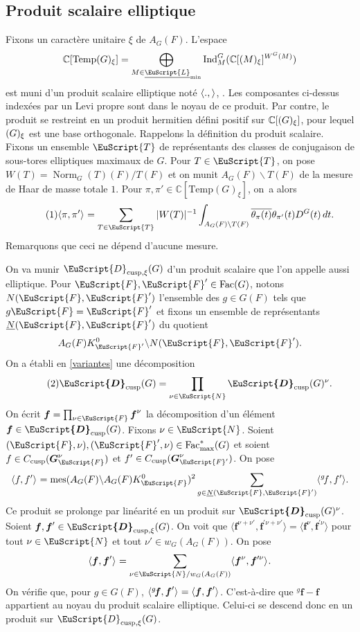 \documentclass[JEP,XML,SOM,Unicode,francais]{cedram}
\let\mathcal \EuScript
\newcommand{\NoChangel}[1]{%
\expandafter\let\csname old\string#1\endcsname=#1
\let#1=\relax
\newcommand{#1}{\mathcode`l="716C\csname old\string#1\endcsname\mathcode`l="7160 }%
}
\let\<\langle
\let\>\rangle
\let\oldS\S
\renewcommand{\S}{\oldS\,}
\newcommand{\gf}{{}^g\!f}
\newcommand{\cusp}{\mathrm{cusp}}
\newcommand{\rell}{\mathrm{ell}} \NoChangel{\rell}
\newcommand{\Ell}{\mathrm{Ell}} \NoChangel{\Ell}
\newcommand{\Fac}{\mathrm{Fac}}
\newcommand{\Ind}{\mathrm{Ind}}
\newcommand{\Temp}{\mathrm{Temp}}
\DeclareMathOperator{\mes}{mes}
\DeclareMathOperator{\Norm}{Norm}
\newcommand{\bmf}{\boldsymbol{f}}
\newcommand{\gbmf}{{}^g\!\boldsymbol{f}}
\newcommand{\bG}{\boldsymbol{G}}
\newcommand{\cD}{\mathcal{D}}
\newcommand{\cF}{\mathcal{F}}
\newcommand{\cL}{\mathcal{L}}
\newcommand{\cN}{\mathcal{N}}
\newcommand{\cT}{\mathcal{T}}
\newcommand{\CC}{\mathbb{C}}
\theoremstyle{plain}
\theoremstyle{definition}
\begin{document}
\subsection{Produit scalaire elliptique}\label{produitscalaireelliptique}
Fixons un caractère unitaire $\xi$ de $A_{G}(F)$. L'espace
\[
\CC[\Temp(G)_{\xi}]=\bigoplus_{M\in\underline{\cL}_{\min}}\Ind_{M}^G(\CC[\Ell(M)_{\xi}]^{W^G(M)})
\]
est muni d'un produit scalaire elliptique noté $\<.,\>_{\rell}$, \cf \cite[\S6]{A2}. Les composantes ci-dessus indexées par un Levi propre sont dans le noyau de ce produit. Par contre, le produit se restreint en un produit hermitien défini positif sur $\CC[\Ell(G)_{\xi}]$, pour lequel $\Ell(G)_{\xi}$ est une base orthogonale. Rappelons la définition du produit scalaire. Fixons un ensemble $\cT_{\rell}$ de représentants des classes de conjugaison de sous-tores elliptiques maximaux de $G$. Pour $T\in \cT_{\rell}$, on pose $W(T)=\Norm_{G}(T)(F)/T(F)$ et on munit $A_{G}(F)\backslash T(F)$ de la mesure de Haar de masse totale $1$. Pour $\pi,\pi'\in \CC[\Temp(G)_{\xi}]$, on~a alors
\begin{equation}\tag{1}\label{produitscalaireelliptique1}
\<\pi,\pi'\>_{\rell}=\sum_{T\in \cT_{\rell}}\vert W(T)\vert ^{-1}\int_{A_{G}(F)\backslash T(F)}\overline{\theta_{\pi}(t)}\theta_{\pi'}(t)D^G(t)\,dt.
\end{equation}
Remarquons que ceci ne dépend d'aucune mesure.

On va munir $\cD_{\cusp,\xi}(G)$ d'un produit scalaire que l'on appelle aussi elliptique. Pour $\cF,\cF'\in \Fac(G)$,
notons $N(\cF,\cF')$ l'ensemble des $g\in G(F)$ tels que $g\cF=\cF'$ et fixons un ensemble de représentants $\underline{N}(\cF,\cF')$ du quotient
\[
A_{G}(F)K_{\cF'}^0\backslash N(\cF,\cF').
\]
On a établi en \ref{variantes} une décomposition
\begin{equation}\tag{2}\label{produitscalaireelliptique2}
\boldsymbol{\cD}_{\cusp}(G)=\prod_{\nu\in \cN}
\boldsymbol{\cD}_{\cusp}(G)^{\nu}.
\end{equation}
On écrit $\bmf=\prod_{\nu\in \cF}\bmf^{\nu}$ la décomposition d'un élément $\bmf\in \boldsymbol{\cD}_{\cusp}(G)$.
Fixons $\nu\in \cN$. Soient $(\cF,\nu),(\cF',\nu)\in \Fac^*_{\max}(G)$ et soient
$f\in C_{\cusp}(\bG_{\cF}^{\nu})$ et $f'\in C_{\cusp}(\bG_{\cF'}^{\nu})$. On pose
\[
\<f,f'\>_{\rell}= \mes(A_{G}(F)\backslash A_{G}(F)K_{\cF}^0)^2\sum_{g\in \underline{N}(\cF,\cF')}\<{\gf},f'\>.
\]
Ce produit se prolonge par linéarité en un produit sur $\boldsymbol{\cD}_{\cusp}(G)^{\nu}$.
Soient $\bmf, \bmf'\in \boldsymbol{\cD}_{\cusp,\xi}(G)$. On voit que $\<\bmf^{\nu+\nu'},\bmf^{\prime\nu+\nu'}\>=\<\bmf^{\nu},\bmf^{\prime\nu}\>$ pour tout $\nu\in \cN$ et tout $\nu'\in w_{G}(A_{G}(F))$. On pose
\[
\<\bmf,\bmf'\>_{\rell}=\sum_{\nu\in \cN/w_{G}(A_{G}(F))}\<\bmf^{\nu},\bmf^{\prime\nu}\>_{\rell}.
\]
On vérifie que, pour $g\in G(F)$, $\<{\gbmf},\bmf'\>_{\rell}=\<\bmf,\bmf'\>_{\rell}$. C'est-à-dire que $\gbmf-\bmf$ appartient au noyau du produit scalaire elliptique. Celui-ci se descend donc en un produit sur $\cD_{\cusp,\xi}(G)$.
\end{document}
